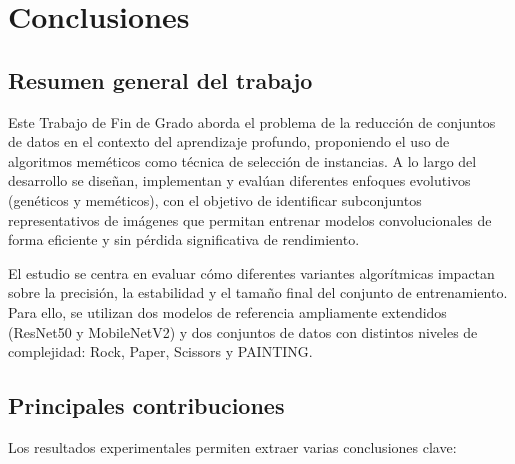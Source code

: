 
\chapter{Conclusiones}\label{ch:conclusiones}
\section{Resumen general del trabajo}\label{sec:resumen-general}

Este Trabajo de Fin de Grado aborda el problema de la reducción de conjuntos de datos en el contexto del aprendizaje profundo,
proponiendo el uso de algoritmos meméticos como técnica de selección de instancias.
A lo largo del desarrollo se diseñan, implementan y evalúan diferentes enfoques evolutivos (genéticos y meméticos),
con el objetivo de identificar subconjuntos representativos de imágenes que permitan entrenar modelos convolucionales de forma eficiente y sin pérdida significativa de rendimiento.

El estudio se centra en evaluar cómo diferentes variantes algorítmicas impactan sobre la precisión, la estabilidad y el tamaño final del conjunto de entrenamiento.
Para ello, se utilizan dos modelos de referencia ampliamente extendidos (ResNet50 y MobileNetV2) y dos conjuntos de datos con distintos niveles de complejidad: Rock, Paper, Scissors y PAINTING.

\section{Principales contribuciones}\label{sec:contribuciones}

Los resultados experimentales permiten extraer varias conclusiones clave:

